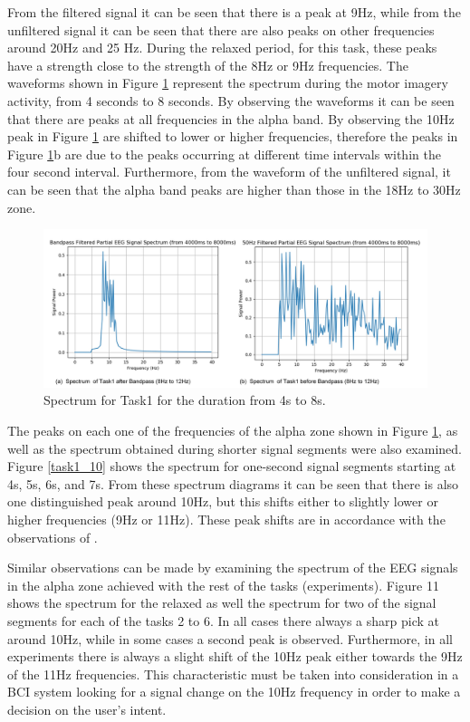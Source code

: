 From the filtered signal it can be seen that there is a peak at 9Hz, while from the unfiltered signal it can be seen that there are also peaks on other frequencies around 20Hz and 25 Hz. During the relaxed period, for this task, these peaks have a strength close to the strength of the 8Hz or 9Hz frequencies. The waveforms shown in Figure \ref{spectrum1} represent the spectrum during the motor imagery activity, from 4 seconds to 8 seconds. By observing the waveforms it can be seen that there are peaks at all frequencies in the alpha band. By observing the 10Hz peak in Figure  \ref{spectrum1}  are shifted to lower or higher frequencies, therefore the peaks in Figure  \ref{spectrum1}b are due to the peaks occurring at different time intervals within the four second interval. Furthermore, from the waveform of the unfiltered signal, it can be seen that the alpha band peaks are higher than those in the 18Hz to 30Hz zone.



 \begin{figure}%
	\centering
	\includegraphics[width=\linewidth]{Figures/spectrum1.jpg} 
	\caption{Spectrum for Task1 for the duration from 4s to 8s.} 
	\label{spectrum1} 
\end{figure}



The peaks on each one of the frequencies of the alpha zone shown in Figure \ref{spectrum1}, as well as the spectrum obtained during shorter signal segments were also examined. Figure \ref{task1_10} shows the spectrum for one-second signal segments starting at 4s, 5s, 6s, and 7s. From these spectrum diagrams it can be seen that there is also one distinguished peak around 10Hz, but this shifts either to slightly lower or higher frequencies (9Hz or 11Hz). These peak shifts are in accordance with the observations of \citep{Pfurtscheller2000, Khulman1978}.  


Similar observations can be made by examining the spectrum of the EEG signals in the alpha zone achieved with the rest of the tasks (experiments).  Figure 11 shows the spectrum for the relaxed as well the spectrum for two of the signal segments for each of the tasks 2 to 6. In all cases there always a sharp pick at around 10Hz, while in some cases a second peak is observed. Furthermore, in all experiments there is always a slight shift of the 10Hz peak either towards the 9Hz of the 11Hz frequencies. This characteristic must be taken into consideration in a BCI system looking for a signal change on the 10Hz frequency in order to make a decision on the user’s intent.

